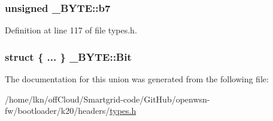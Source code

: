 \subsubsection[{\texorpdfstring{b7}{b7}}]{\setlength{\rightskip}{0pt plus 5cm}unsigned \+\_\+\+B\+Y\+T\+E\+::b7}\hypertarget{union___b_y_t_e_a4663fb292155715dddddb77458687c4b}{}\label{union___b_y_t_e_a4663fb292155715dddddb77458687c4b}


Definition at line 117 of file types.\+h.

\subsubsection[{\texorpdfstring{Bit}{Bit}}]{\setlength{\rightskip}{0pt plus 5cm}struct \{ ... \}  \+\_\+\+B\+Y\+T\+E\+::\+Bit}\hypertarget{union___b_y_t_e_a686e27e1bff57d6aed0a5029d828df7d}{}\label{union___b_y_t_e_a686e27e1bff57d6aed0a5029d828df7d}


The documentation for this union was generated from the following file\+:\begin{DoxyCompactItemize}
\item 
/home/lkn/off\+Cloud/\+Smartgrid-\/code/\+Git\+Hub/openwsn-\/fw/bootloader/k20/headers/\hyperlink{types_8h}{types.\+h}\end{DoxyCompactItemize}
